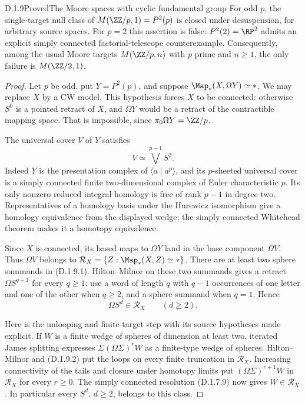 \begin{claim}{D.1.9}{Proved}{The Moore spaces with cyclic fundamental group}
For odd $p$, the single-target null class of
$M(\ZZ/p,1)=P^2(p)$ is closed under desuspension, for arbitrary
source spaces. For $p=2$ this assertion is false:
$P^2(2)=\RP^2$ admits an explicit simply connected
factorial-telescope counterexample. Consequently, among the
usual Moore targets $M(\ZZ/p,n)$ with $p$ prime and $n\geq1$,
the only failure is $M(\ZZ/2,1)$.
\end{claim}
\begin{proof}
Let $p$ be odd, put $Y=P^2(p)$, and suppose
$\Map_*(X,\Omega Y)\simeq *$. We may replace $X$ by a CW
model. This hypothesis forces $X$ to be connected: otherwise
$S^0$ is a pointed retract of $X$, and $\Omega Y$ would be a
retract of the contractible mapping space. That is impossible,
since $\pi_0\Omega Y=\ZZ/p$.

The universal cover $V$ of $Y$ satisfies
\[
                         V\simeq\bigvee^{p-1}S^2.
 \tag{D.1.9.1}
\]
Indeed $Y$ is the presentation complex of $\langle a\mid a^p\rangle$,
and its $p$-sheeted universal cover is a simply connected finite
two-dimensional complex of Euler characteristic $p$. Its only
nonzero reduced integral homology is free of rank $p-1$ in degree
two. Representatives of a homology basis under the Hurewicz
isomorphism give a homology equivalence from the displayed wedge;
the simply connected Whitehead theorem makes it a homotopy
equivalence.

Since $X$ is connected, its based maps to $\Omega Y$ land in
the base component $\Omega V$. Thus $\Omega V$ belongs to
$\mathcal R_X=\{Z:\Map_*(X,Z)\simeq *\}$.
There are at least two sphere summands in (D.1.9.1).
Hilton--Milnor on these two summands gives a retract
$\Omega S^{q+1}$ for every $q\geq1$: use a word of length
$q$ with $q-1$ occurrences of one letter and one of the other
when $q\geq2$, and a sphere summand when $q=1$.
Hence
\[
                      \Omega S^d\in\mathcal R_X
                      \qquad(d\geq2).              \tag{D.1.9.2}
\]

Here is the unlooping and finite-target step with its source
hypotheses made explicit. If $W$ is a finite wedge of spheres
of dimension at least two, iterated James splitting expresses
$\Sigma(\Omega\Sigma)^rW$ as a finite-type wedge of spheres.
Hilton--Milnor and (D.1.9.2) put the loops on every finite
truncation in $\mathcal R_X$. Increasing connectivity of the
tails and closure under homotopy limits put
$(\Omega\Sigma)^{r+1}W$ in $\mathcal R_X$ for every $r\geq0$.
The simply connected resolution (D.1.7.9) now gives
$W\in\mathcal R_X$. In particular every $S^d$, $d\geq2$,
belongs to this class.


\end{proof}

